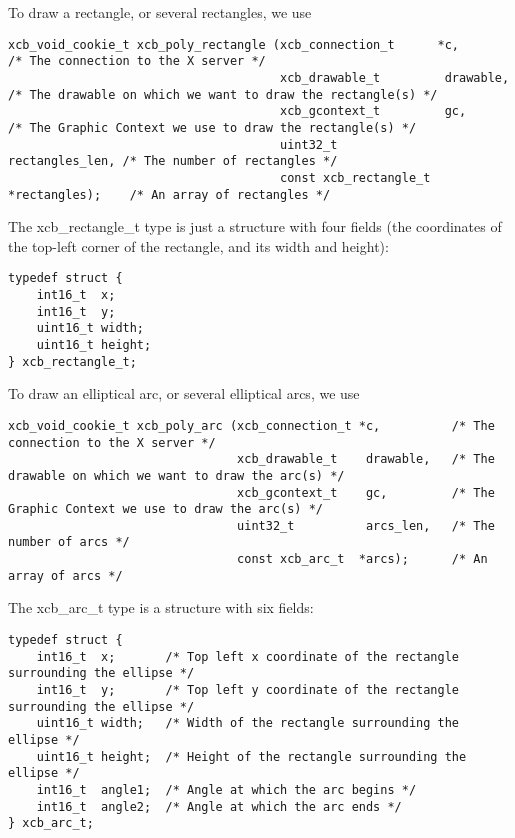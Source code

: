 \documentclass[12pt,oneside,titlepage]{book}
\begin{document}
\begin{enumerate}
\begin{enumerate}
    To draw a rectangle, or several rectangles, we use

\begin{verbatim}
xcb_void_cookie_t xcb_poly_rectangle (xcb_connection_t      *c,              /* The connection to the X server */
                                      xcb_drawable_t         drawable,       /* The drawable on which we want to draw the rectangle(s) */
                                      xcb_gcontext_t         gc,             /* The Graphic Context we use to draw the rectangle(s) */
                                      uint32_t               rectangles_len, /* The number of rectangles */
                                      const xcb_rectangle_t *rectangles);    /* An array of rectangles */
\end{verbatim}

    The {xcb\_rectangle\_t} type is just a structure with four fields
    (the coordinates of the top-left corner of the rectangle, and its
    width and height):

\begin{verbatim}
typedef struct {
    int16_t  x;
    int16_t  y;
    uint16_t width;
    uint16_t height;
} xcb_rectangle_t;
\end{verbatim}

    To draw an elliptical arc, or several elliptical arcs, we use

\begin{verbatim}
xcb_void_cookie_t xcb_poly_arc (xcb_connection_t *c,          /* The connection to the X server */
                                xcb_drawable_t    drawable,   /* The drawable on which we want to draw the arc(s) */
                                xcb_gcontext_t    gc,         /* The Graphic Context we use to draw the arc(s) */
                                uint32_t          arcs_len,   /* The number of arcs */
                                const xcb_arc_t  *arcs);      /* An array of arcs */
\end{verbatim}

    The {xcb\_arc\_t} type is a structure with six fields:

\begin{verbatim}
typedef struct {
    int16_t  x;       /* Top left x coordinate of the rectangle surrounding the ellipse */
    int16_t  y;       /* Top left y coordinate of the rectangle surrounding the ellipse */
    uint16_t width;   /* Width of the rectangle surrounding the ellipse */
    uint16_t height;  /* Height of the rectangle surrounding the ellipse */
    int16_t  angle1;  /* Angle at which the arc begins */
    int16_t  angle2;  /* Angle at which the arc ends */
} xcb_arc_t;
\end{verbatim}


\end{enumerate}
\end{enumerate}
\end{document}
